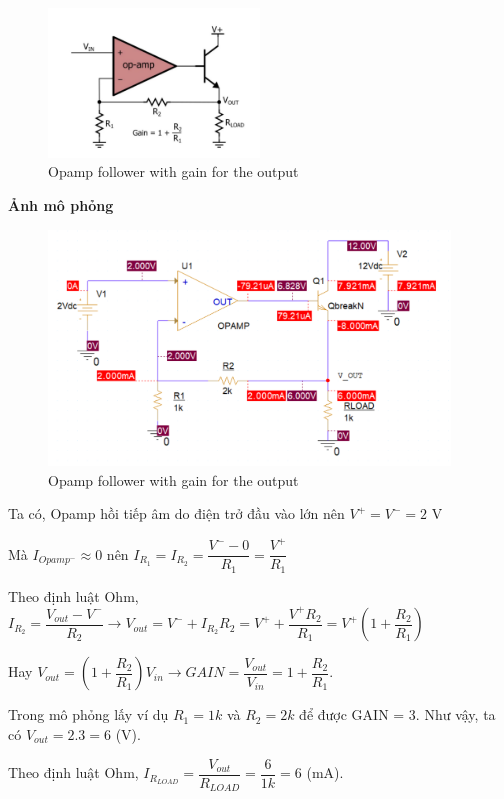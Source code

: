 \begin{figure}[ht]
    \centering
    \includegraphics[width=0.5\textwidth]{graphics/ex1/f7.png}
    \caption{Opamp follower with gain for the output}
\end{figure}

\textbf{Ảnh mô phỏng}

\begin{figure}[ht]
    \centering
    \includegraphics[width=0.95\textwidth]{graphics/ex1/f8.png}
    \caption{Opamp follower with gain for the output}
\end{figure}

Ta có, Opamp hồi tiếp âm do điện trở đầu vào lớn nên $V^+ = V^- = 2$ V

Mà $I_{Opamp^-} \approx 0$ nên $I_{R_1} = I_{R_2} = \dfrac{V^- - 0}{R_1} = \dfrac{V^+}{R_1}$

Theo định luật Ohm,  $I_{R_2} = \dfrac{V_{out} - V^-}{R_2} \rightarrow V_{out} = V^- + I_{R_2}R_2 = V^+ + \dfrac{V^+R_2}{R_1} = V^+(1 + \dfrac{R_2}{R_1})$

Hay $V_{out} = (1 + \dfrac{R_2}{R_1})V_{in} \rightarrow GAIN = \dfrac{V_{out}}{V_{in}} = 1 + \dfrac{R_2}{R_1}$.

Trong mô phỏng lấy ví dụ $R_1 = 1k$ và $R_2 = 2k$ để được GAIN = 3. Như vậy, ta có $V_{out} = 2.3 = 6$ (V).

Theo định luật Ohm, $I_{R_{LOAD}} = \dfrac{V_{out}}{R_{LOAD}} = \dfrac{6}{1k} = 6 $ (mA).

